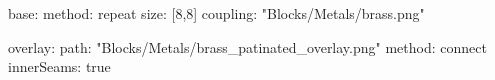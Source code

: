 base:
  method: repeat
  size: [8,8]
  coupling: "Blocks/Metals/brass.png"
  
overlay:
  path: "Blocks/Metals/brass_patinated_overlay.png"
  method: connect
  innerSeams: true